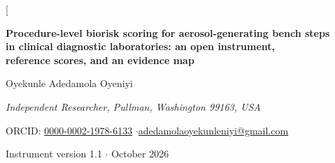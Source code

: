 



\twocolumn[
\begin{@twocolumnfalse}
\vspace{-6mm}
\begin{center}
{\large\bfseries Procedure-level biorisk scoring for aerosol-generating bench steps\\[2pt]
in clinical diagnostic laboratories: an open instrument,\\[2pt]
reference scores, and an evidence map\par}
\vspace{5mm}
{\normalsize Oyekunle Adedamola Oyeniyi\,\orcidmark\par}
\vspace{1.5mm}
{\small\itshape Independent Researcher, Pullman, Washington 99163, USA\par}
\vspace{1mm}
{\footnotesize ORCID: \href{https://orcid.org/0000-0002-1978-6133}{0000-0002-1978-6133}
\quad$\cdot$\quad \href{mailto:adedamolaoyekunleniyi@gmail.com}{adedamolaoyekunleniyi@gmail.com}\par}
\vspace{2mm}
{\footnotesize Instrument version 1.1 \quad$\cdot$ October 2026\par}
\end{center}
\vspace{4mm}



\end{@twocolumnfalse}
